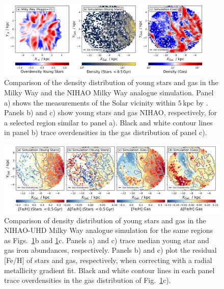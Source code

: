 \documentclass[twocolumn,apj,numberedappendix,appendixfloats]{openjournal}
\begin{document}
\begin{CJK*}{UTF8}{gbsn}
\begin{figure}
    \centering
    \includegraphics[width=0.925\textwidth]{figures/overdensities_mw_vs_nihao.png}
    \caption{Comparison of the density distribution of young stars and gas in the Milky Way and the NIHAO Milky Way analogue simulation. Panel a) shows the measurements of the Solar vicinity within $5\,\mathrm{kpc}$ by \citet{Poggio2021}. Panels b) and c) show young stars and gas NIHAO, respectively, for a selected region similar to panel a). Black and white contour lines in panel b) trace overdensities in the gas distribution of panel c).}
    \label{fig:overdensities_mw_vs_nihao}
\end{figure}

\begin{figure}
    \centering
    \includegraphics[width=\textwidth]{figures/nihao_gas_stars_density_overlay.png}
    \caption{Comparison of density distribution of young stars and gas in the NIHAO-UHD Milky Way analogue simulation for the same regions as Figs.~\ref{fig:overdensities_mw_vs_nihao}b and \ref{fig:overdensities_mw_vs_nihao}c. Panels a) and c) trace median young star and gas iron abundances, respectively. Panels b) and c) plot the residual [Fe/H] of stars and gas, respectively, when correcting with a radial metallicity gradient fit. Black and white contour lines in each panel trace overdensities in the gas distribution of Fig.~\ref{fig:overdensities_mw_vs_nihao}c).}
    \label{fig:nihao_gas_stars_density_overlay}
\end{figure}


\end{CJK*}
\end{document}
